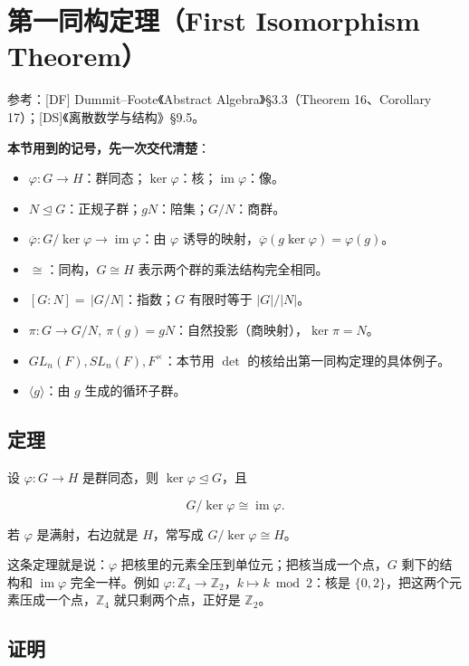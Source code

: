\section{第一同构定理（First Isomorphism Theorem）}


参考：[DF] Dummit–Foote《Abstract Algebra》§3.3（Theorem 16、Corollary 17）；[DS]《离散数学与结构》§9.5。

\textbf{本节用到的记号，先一次交代清楚}：

\begin{itemize}
\item $\varphi:G\to H$：群同态；$\ker\varphi$：核；$\operatorname{im}\varphi$：像。
\item $N\trianglelefteq G$：正规子群；$gN$：陪集；$G/N$：商群。
\item $\overline{\varphi}:G/\ker\varphi\to\operatorname{im}\varphi$：由 $\varphi$ 诱导的映射，$\overline{\varphi}(g\ker\varphi)=\varphi(g)$。
\item $\cong$：同构，$G\cong H$ 表示两个群的乘法结构完全相同。
\item $[G:N]=\,|G/N|$：指数；$G$ 有限时等于 $|G|/|N|$。
\item $\pi:G\to G/N,\ \pi(g)=gN$：自然投影（商映射），$\ker\pi=N$。
\item $GL_n(F),SL_n(F),F^\times$：本节用 $\det$ 的核给出第一同构定理的具体例子。
\item $\langle g\rangle$：由 $g$ 生成的循环子群。
\end{itemize}


\subsection{定理}


设 $\varphi:G\to H$ 是群同态，则 $\ker\varphi\trianglelefteq G$，且

\[G/\ker\varphi\cong\operatorname{im}\varphi.\]

若 $\varphi$ 是满射，右边就是 $H$，常写成 $G/\ker\varphi\cong H$。

这条定理就是说：$\varphi$ 把核里的元素全压到单位元；把核当成一个点，$G$ 剩下的结构和 $\operatorname{im}\varphi$ 完全一样。例如 $\varphi:\mathbb Z_4\to\mathbb Z_2$，$k\mapsto k\bmod 2$：核是 $\{0,2\}$，把这两个元素压成一个点，$\mathbb Z_4$ 就只剩两个点，正好是 $\mathbb Z_2$。

\subsection{证明}


